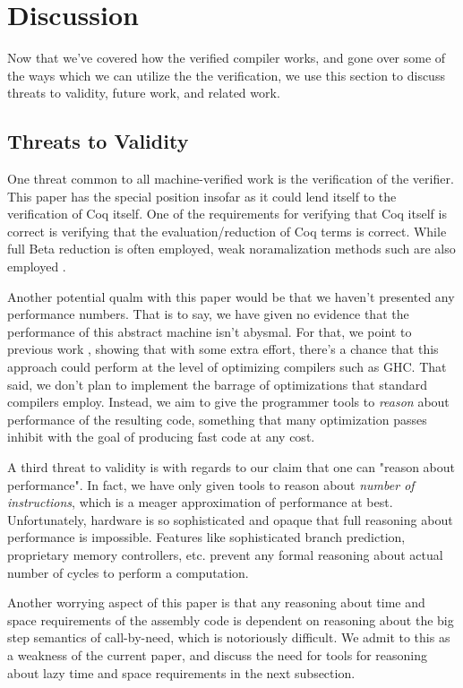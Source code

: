 \section{Discussion} \label{sec:discussion}

Now that we've covered how the verified compiler works, and gone over some of
the ways which we can utilize the the verification, we use this section to
discuss threats to validity, future work, and related work. 

\subsection{Threats to Validity}

One threat common to all machine-verified work is the verification of the
verifier. This paper has the special position insofar as it could lend itself to
the verification of Coq itself. One of the requirements for verifying that Coq
itself is correct is verifying that the evaluation/reduction of Coq terms is
correct. While full Beta reduction is often employed, weak noramalization
methods such are also employed \cite{?}.  

Another potential qualm with this paper would be that we haven't presented any
performance numbers. That is to say, we have given no evidence that the
performance of this abstract machine isn't abysmal. For that, we point to
previous work \cite{?}, showing that with some extra effort, there's a chance
that this approach could perform at the level of optimizing compilers such as
GHC. That said, we don't plan to implement the barrage of optimizations that
standard compilers employ. Instead, we aim to give the programmer tools to
\emph{reason} about performance of the resulting code, something that many
optimization passes inhibit with the goal of producing fast code at any cost. 

A third threat to validity is with regards to our claim that one can "reason
about performance". In fact, we have only given tools to reason about \emph{number of
instructions}, which is a meager approximation of performance at best.
Unfortunately, hardware is so sophisticated and opaque that full reasoning about
performance is impossible. Features like sophisticated branch prediction,
proprietary memory controllers, etc. prevent any formal reasoning about actual
number of cycles to perform a computation.  

Another worrying aspect of this paper is that any reasoning about time and space
requirements of the assembly code is dependent on reasoning about the big step
semantics of call-by-need, which is notoriously difficult. We admit to this as a
weakness of the current paper, and discuss the need for tools for reasoning
about lazy time and space requirements in the next subsection.

